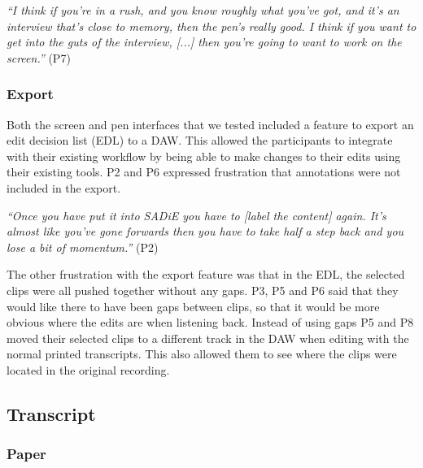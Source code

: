 \textit{``I think if you're in a rush, and you know roughly what you've got, and it's an interview that's close to
memory, then the pen's really good. I think if you want to get into the guts of the interview, [...] then you're going
to want to work on the screen.''} (P7)

\subsubsection{Export}

Both the screen and pen interfaces that we tested included a feature to export an edit decision list (EDL) to a DAW.
This allowed the participants to integrate with their existing workflow by being able to make changes to their edits
using their existing tools.  P2 and P6 expressed frustration that annotations were not included in the export.

\textit{``Once you have put it into SADiE you have to [label the content] again. It's almost like you've gone forwards
then you have to take half a step back and you lose a bit of momentum.''} (P2)


The other frustration with the export feature was that in the EDL, the selected clips were all pushed together without
any gaps. P3, P5 and P6 said that they would like there to have been gaps between clips, so that it would be more
obvious where the edits are when listening back. Instead of using gaps P5 and P8 moved their selected clips to a
different track in the DAW when editing with the normal printed transcripts. This also allowed them to see where the
clips were located in the original recording.


\subsection{Transcript}

\subsubsection{Paper}

